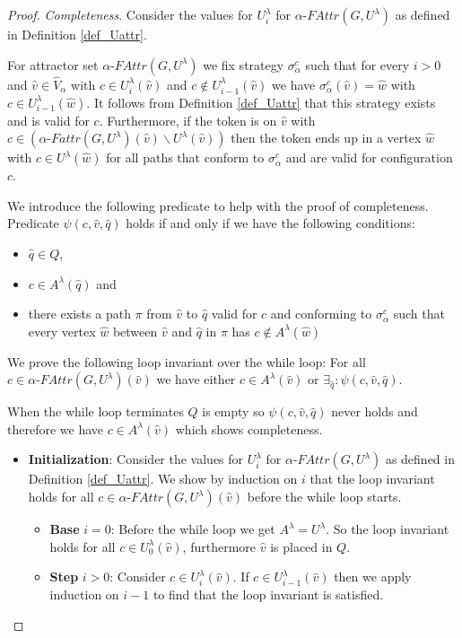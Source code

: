 \begin{theorem}
\begin{proof}
		\textit{Completeness}. Consider the values for $U^\lambda_i$ for $\alpha\textit{-FAttr}(G,U^\lambda)$ as defined in Definition \ref{def_Uattr}.
		
		For attractor set $\alpha\textit{-FAttr}(G,U^\lambda)$ we fix strategy $\sigma_\alpha^c$ such that for every $i>0$ and $\hat{v} \in \hat{V}_\alpha$ with $c\in U^\lambda_i(\hat{v})$ and $c\notin U^\lambda_{i-1}(\hat{v})$ we have $\sigma_\alpha^c(\hat{v}) = \hat{w}$ with $c \in U^\lambda_{i-1}(\hat{w})$.  It follows from Definition \ref{def_Uattr} that this strategy exists and is valid for $c$. Furthermore, if the token is on $\hat{v}$ with $c \in (\alpha\textit{-Fattr}(G,U^\lambda)(\hat{v}) \backslash U^\lambda(\hat{v}))$ then the token ends up in a vertex $\hat{w}$ with $c \in U^\lambda(\hat{w})$ for all paths that conform to $\sigma_\alpha^c$ and are valid for configuration $c$. 
		
		We introduce the following predicate to help with the proof of completeness.
		Predicate $\psi(c,\hat{v},\hat{q})$ holds if and only if we have the following conditions:
		\begin{itemize}
			\item $\hat{q} \in Q$,
			\item $c \in A^\lambda(\hat{q})$ and
			\item there exists a path $\pi$ from $\hat{v}$ to $\hat{q}$ valid for $c$ and conforming to $\sigma_\alpha^c$ such that every vertex $\hat{w}$ between $\hat{v}$ and $\hat{q}$ in $\pi$ has $c \notin A^\lambda(\hat{w})$
		\end{itemize}
	
		We prove the following loop invariant over the while loop: For all $c \in \alpha\textit{-FAttr}(G,U^\lambda)(\hat{v})$ we have either $c \in A^\lambda(\hat{v})$ or $\exists_{\hat{q}}:\psi(c,\hat{v},\hat{q})$.
		
		When the while loop terminates $Q$ is empty so $\psi(c,\hat{v},\hat{q})$ never holds and therefore we have $c \in A^\lambda(\hat{v})$ which shows completeness.
		
		\begin{itemize}[\ \ ]
			\item \textbf{Initialization}:
			Consider the values for $U^\lambda_i$ for $\alpha\textit{-FAttr}(G,U^\lambda)$ as defined in Definition \ref{def_Uattr}. We show by induction on $i$ that the loop invariant holds for all $c \in \alpha\textit{-FAttr}(G,U^\lambda)(\hat{v})$ before the while loop starts.
			\begin{itemize}[\ \ ]
				\item \textbf{Base} $i = 0$: Before the while loop we get $A^\lambda = U^\lambda$. So the loop invariant holds for all $c \in U^\lambda_0(\hat{v})$, furthermore $\hat{v}$ is placed in $Q$.				
				\item \textbf{Step} $i > 0$: Consider $c \in U^\lambda_i(\hat{v})$. If $c \in U^\lambda_{i-1}(\hat{v})$ then we apply induction on $i-1$ to find that the loop invariant is satisfied.
				

\end{itemize}
\end{itemize}
\end{proof}
\end{theorem}
